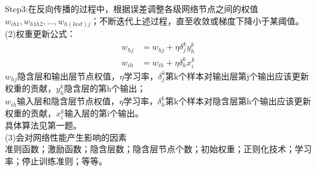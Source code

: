 \documentclass[a4paper,11pt,onecolumn,oneside,UTF8]{article}
\begin{document}
\begin{enumerate}
          Step3:在反向传播的过程中，根据误差调整各级网络节点之间的权值$w_{ih1},w_{h1h2},...,w_{h(last)j}$；不断迭代上述过程，直至收敛或梯度下降小于某阈值。\\
          (2)权重更新公式：\\
          $$
              \begin{aligned}
                  w_{hj} & =w_{hj}+\eta\delta_j^ky_h^k \\
                  w_{ih} & =w_{ih}+\eta\delta_h^kx_i^k
              \end{aligned}
          $$
          $w_{hj}$隐含层和输出层节点权值，$\eta$学习率，$\delta_j^k$第k个样本对输出层第j个输出应该更新权重的贡献，$y_h^k$隐含层的第h个输出；\\
          $w_{ih}$输入层和隐含层节点权值，$\eta$学习率，$\delta_h^k$第k个样本对隐含层第h个输出应该更新权重的贡献，$x_i^k$输入层的第i个输出。\\
          具体算法见第一题。\\
          (3)会对网络性能产生影响的因素\\
          准则函数；激励函数；隐含层数；隐含层节点个数；初始权重；正则化技术；学习率；停止训练准则；等等。
\end{enumerate}
\end{document}
